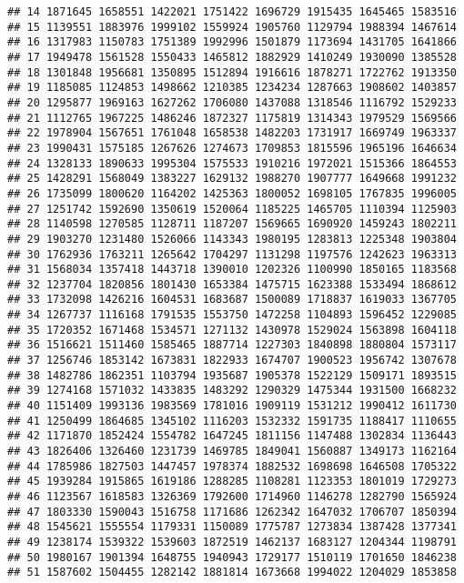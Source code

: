 \documentclass[
]{article}
\begin{document}
\begin{verbatim}
## 14 1871645 1658551 1422021 1751422 1696729 1915435 1645465 1583516
## 15 1139551 1883976 1999102 1559924 1905760 1129794 1988394 1467614
## 16 1317983 1150783 1751389 1992996 1501879 1173694 1431705 1641866
## 17 1949478 1561528 1550433 1465812 1882929 1410249 1930090 1385528
## 18 1301848 1956681 1350895 1512894 1916616 1878271 1722762 1913350
## 19 1185085 1124853 1498662 1210385 1234234 1287663 1908602 1403857
## 20 1295877 1969163 1627262 1706080 1437088 1318546 1116792 1529233
## 21 1112765 1967225 1486246 1872327 1175819 1314343 1979529 1569566
## 22 1978904 1567651 1761048 1658538 1482203 1731917 1669749 1963337
## 23 1990431 1575185 1267626 1274673 1709853 1815596 1965196 1646634
## 24 1328133 1890633 1995304 1575533 1910216 1972021 1515366 1864553
## 25 1428291 1568049 1383227 1629132 1988270 1907777 1649668 1991232
## 26 1735099 1800620 1164202 1425363 1800052 1698105 1767835 1996005
## 27 1251742 1592690 1350619 1520064 1185225 1465705 1110394 1125903
## 28 1140598 1270585 1128711 1187207 1569665 1690920 1459243 1802211
## 29 1903270 1231480 1526066 1143343 1980195 1283813 1225348 1903804
## 30 1762936 1763211 1265642 1704297 1131298 1197576 1242623 1963313
## 31 1568034 1357418 1443718 1390010 1202326 1100990 1850165 1183568
## 32 1237704 1820856 1801430 1653384 1475715 1623388 1533494 1868612
## 33 1732098 1426216 1604531 1683687 1500089 1718837 1619033 1367705
## 34 1267737 1116168 1791535 1553750 1472258 1104893 1596452 1229085
## 35 1720352 1671468 1534571 1271132 1430978 1529024 1563898 1604118
## 36 1516621 1511460 1585465 1887714 1227303 1840898 1880804 1573117
## 37 1256746 1853142 1673831 1822933 1674707 1900523 1956742 1307678
## 38 1482786 1862351 1103794 1935687 1905378 1522129 1509171 1893515
## 39 1274168 1571032 1433835 1483292 1290329 1475344 1931500 1668232
## 40 1151409 1993136 1983569 1781016 1909119 1531212 1990412 1611730
## 41 1250499 1864685 1345102 1116203 1532332 1591735 1188417 1110655
## 42 1171870 1852424 1554782 1647245 1811156 1147488 1302834 1136443
## 43 1826406 1326460 1231739 1469785 1849041 1560887 1349173 1162164
## 44 1785986 1827503 1447457 1978374 1882532 1698698 1646508 1705322
## 45 1939284 1915865 1619186 1288285 1108281 1123353 1801019 1729273
## 46 1123567 1618583 1326369 1792600 1714960 1146278 1282790 1565924
## 47 1803330 1590043 1516758 1171686 1262342 1647032 1706707 1850394
## 48 1545621 1555554 1179331 1150089 1775787 1273834 1387428 1377341
## 49 1238174 1539322 1539603 1872519 1462137 1683127 1204344 1198791
## 50 1980167 1901394 1648755 1940943 1729177 1510119 1701650 1846238
## 51 1587602 1504455 1282142 1881814 1673668 1994022 1204029 1853858
\end{verbatim}
\end{document}
